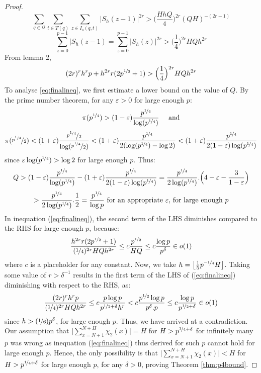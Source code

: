 \documentclass{report}
\begin{document}
\begin{proof}
$$\sum_{q\in\mathcal{Q}}\sum\limits_{t\in T(q)}\sum\limits_{z\in I_o(q,t)}\lvert S_h(z-1) \rvert^{2r} > \Big( \frac{HhQ}{4}\Big)^{2r}(QH)^{-(2r-1)}$$
$$\sum\limits_{z=0}^{p-1}\lvert S_h(z-1) = \sum\limits_{z=0}^{p-1}\lvert S_h(z) \rvert^{2r}>\Big(\frac{1}{4}\Big)^{2r}HQh^{2r}$$
From lemma 2,
\begin{equation} \label{eq:finalineq}
(2r)^{r}h^{r}p+h^{2r}r(2p^{\nicefrac{1}{2}}+1)>\Big(\frac{1}{4}\Big)^{2r}HQh^{2r}
\end{equation}
To analyse \ref{eq:finalineq}, we first estimate a lower bound on the value of $Q$. By the prime number theorem, for any $\varepsilon>0$ for large enough $p$:
\[\pi(p^{\nicefrac{1}{4}}) > (1-\varepsilon)\frac{p^{\nicefrac{1}{4}}}{\log (p^{\nicefrac{1}{4}})}\quad\text { and}\]
\[\pi(\nicefrac{p^{\nicefrac{1}{4}}}{2}) < (1+\varepsilon)\frac{\nicefrac{p^{\nicefrac{1}{4}}}{2}}{\log (\nicefrac {p^{\nicefrac{1}{4}}}{2})} < (1+\varepsilon)\frac{p^{\nicefrac{1}{4}}}{2(\log (p^{\nicefrac{1}{4}}) - \log 2)} < (1+\varepsilon)\frac{p^{\nicefrac{1}{4}}}{2(1-\varepsilon)\log (p^{\nicefrac{1}{4}})}\]
since $\varepsilon\log (p^{\nicefrac{1}{4}}) > \log 2$ for large enough $p$. Thus:
\[Q > (1-\varepsilon)\frac{p^{\nicefrac{1}{4}}}{\log (p^{\nicefrac{1}{4}})} - (1+\varepsilon) \frac {p^{\nicefrac {1}{4}}} {2(1-\varepsilon)\log (p^{\nicefrac{1}{4}})} = \frac {p^{\nicefrac {1}{4}}}{2 \log (p^{\nicefrac {1}{4}})}.\Big(4-\varepsilon-\frac{3}{1-\varepsilon}\Big)\]
\[ > \frac {p^{\nicefrac {1}{4}}}{2 \log (p^{\nicefrac {1}{4}})}.\frac {1}{2} = \frac {p^{\nicefrac {1}{4}}}{\log p} \text { for an appropriate }\varepsilon \text {, for large enough }p\]
In inequation (\ref{eq:finalineq}), the second term of the LHS diminishes compared to the RHS for large enough $p$, because:
\[ \frac{h^{2r}r(2p^{\nicefrac{1}{2}}+1)}{(\nicefrac{1}{4})^{2r}HQh^{2r}} \leq c\frac{p^{\nicefrac{1}{2}}}{HQ} \leq c\frac{\log p}{p^{\delta}} \in o(1)\]
where $c$ is a placeholder for any constant. Now, we take $h=\left \lfloor \frac{1}{5}p^{\nicefrac{-1}{4}}H \right \rfloor$. Taking some value of $r>\delta^{-1}$ results in the first term of the LHS of (\ref{eq:finalineq}) diminishing with respect to the RHS, as:
\[\frac{(2r)^{r}h^{r}p}{(\nicefrac{1}{4})^{2r}HQh^{2r}} \leq c \frac{p\log p}{p^{\nicefrac{1}{2}+\delta}h^r} < c\frac{p^{\nicefrac{1}{2}}\log p}{p^{\delta}.p} \leq c\frac{\log p}{p^{\nicefrac{1}{2}+\delta}} \in o(1)\]
since $h>(\nicefrac{1}{6})p^{\delta}$, for large enough $p$. Thus, we have arrived at a contradiction. Our assumption that $\Big \lvert \sum\limits_{x=N+1}^{N+H}\chi_2(x)\Big \rvert=H$ for $H>p^{\nicefrac{1}{4}+\delta}$ for infinitely many $p$ was wrong as inequation (\ref{eq:finalineq}) thus derived for such $p$ cannot hold for large enough $p$. Hence, the only possibility is that $\Big \lvert \sum\limits_{x=N+1}^{N+H}\chi_2(x)\Big \rvert<H$ for $H>p^{\nicefrac{1}{4}+\delta}$ for large enough $p$, for any $\delta>0$, proving Theorem \ref{thm:p4bound}.
\end{proof}
%
%
\end{document}
